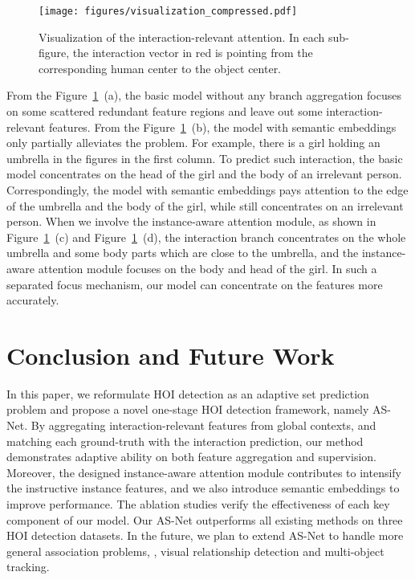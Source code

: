 \documentclass[final]{cvpr}
\begin{document}
\begin{figure}[ht]
  \centering
\texttt{[image: figures/visualization\_compressed.pdf]}
  \vspace{-4.5mm}
  \caption{Visualization of the interaction-relevant attention. In each sub-figure, the interaction vector in red is pointing from the corresponding human center to the object center.
  }\vspace{-1mm}
  
  \label{visualization}
\end{figure}

From the Figure~\ref{visualization}~(a), the basic model without any branch aggregation focuses on some scattered redundant feature regions and leave out some interaction-relevant features. From the Figure~\ref{visualization}~(b), the model with semantic embeddings only partially alleviates the problem. For example, there is a girl holding an umbrella in the figures in the first column. To predict such interaction, the basic model concentrates on the head of the girl and the body of an irrelevant person. Correspondingly, the model with semantic embeddings pays attention to the edge of the umbrella and the body of the girl, while still concentrates on an irrelevant person. When we involve the instance-aware attention module, as shown in Figure~\ref{visualization}~(c) and Figure~\ref{visualization}~(d), the interaction branch concentrates on the whole umbrella and some body parts which are close to the umbrella, and the instance-aware attention module focuses on the body and head of the girl. In such a separated focus mechanism, our model can concentrate on the features more accurately.
\vspace{-3.5mm}\section{Conclusion and Future Work}
\vspace{-1.5mm}
In this paper, we reformulate HOI detection as an adaptive set prediction problem and propose a novel one-stage HOI detection framework, namely AS-Net. By aggregating interaction-relevant features from global contexts, and matching each ground-truth with the interaction prediction, our method demonstrates adaptive ability on both feature aggregation and supervision. Moreover, the designed instance-aware attention module contributes to intensify the instructive instance features, and we also introduce semantic embeddings to improve performance. The ablation studies verify the effectiveness of each key component of our model. Our AS-Net outperforms all existing methods on three HOI detection datasets. In the future, we plan to extend AS-Net to handle more general association problems, \eg, visual relationship detection and multi-object tracking.
\end{document}
